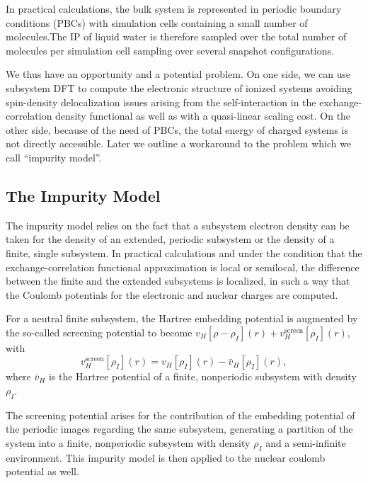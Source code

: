 \documentclass[notitlepage,12pt]{report}
\begin{document}
	In practical calculations, the bulk system is represented in periodic boundary conditions (PBCs) with simulation cells containing a small number of molecules.The IP of liquid water is therefore sampled over the total number of molecules per simulation cell sampling over several snapshot configurations. 
	
	We thus have an opportunity and a potential problem. On one side, we can use subsystem DFT to compute the electronic structure of ionized systems avoiding spin-density delocalization issues arising from the self-interaction in the exchange-correlation density functional \supercite{ciofini2005self,bao2018self} as well as with a quasi-linear scaling cost. On the other side, because of the need of PBCs, the total energy of charged systems is not directly accessible\supercite{duan2000ewald}. Later we outline a workaround to the problem which we call ``impurity model''. 

\subsection{The Impurity Model}\label{IM}
	The impurity model relies on the fact that a subsystem electron density can be taken for the density of an extended, periodic subsystem or the density of a finite, single subsystem. In practical calculations and under the condition that the exchange-correlation functional approximation is local or semilocal, the difference between the finite and the extended subsystems is localized, in such a way that the Coulomb potentials for the electronic and nuclear charges are computed. 

	For a neutral finite subsystem, the Hartree embedding potential is augmented by the so-called screening potential to become $v_H[\rho-\rho_I](r)+v^{\mathrm{screen}}_H[\rho_I](r)$, with 
	\begin{equation}
		\label{sc1}
		v^{\mathrm{screen}}_H[\rho_I](r) = v_H[\rho_I](r) - \bar{v}_H[\rho_I](r),
	\end{equation}
	where $\bar{v}_H$ is the Hartree potential of a finite, nonperiodic subsystem with density $\rho_I$. 
	
	The screening potential arises for the contribution of the embedding potential of the periodic images regarding the same subsystem, generating a partition of the system into a finite, nonperiodic subsystem with density $\rho_I$ and a semi-infinite environment. This impurity model is then applied to the nuclear coulomb potential as well.
	
\end{document}
